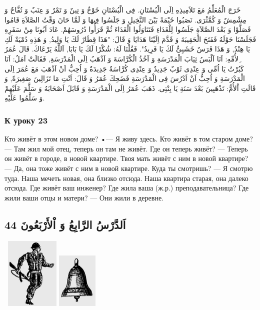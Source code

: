 \documentclass[a5paper]{article}
\begin{document}
خَرَجَ الْمُعَلِّمُ مَعَ تَلاَمِيذِهِ اِلَى الْبُسْتَانِ. فِى الْبُسْتَانِ خَوْخٌ وَ تِينٌ وَ تَمْرٌ وَ عِنَبٌ وَ تُفَّاحٌ وَ مِشْمِشٌ وَ كُمَّثْرَى. نَصَبُوا خَيْمَةً بَيْنَ النَّخِيلِ وَ جَلَسُوا فِيهَا وَ لَمَّا حَانَ وَقْتُ الصَّلاَةِ قَامُوا فَصَلَّوْا وَ بَعْدَ الصَّلاَةِ جَلَسُوا لِلْغَدَاءِ فَتَنَاوَلُوا الْغَدَاءَ ثُمَّ قَرَأُوا دُرُوسَهُمْ. عَادَ اَبُونَا مِنْ سَفَرِهِ فَجَلَسْنَا حَوْلَهُ فَفَتَحَ الْحَقِيبَةَ وَ قَدَّمَ اِلَيْنَا هَدَايَا وَ قَالَ: "هَذَا قِطَارٌ لَكَ يَا وَلِيدُ, وَ هَذِهِ دُمْيَةٌ لَكِ يَا هِنْدُ, وَ هَذَا فَرَسٌ خَشَبِىٌّ لَكَ يَا فَرِيدُ". فَقُلْنَا لَهُ: شُكْرًا لَكَ يَا بَابَا, اَللَّهُ يَرْعَاكَ. قَالَ عُمَرُ ِلأُمِّهِ: اَنَا اَلْبَسُ ثِيَابَ الْمَدْرَسَةِ وَ آخُذُ الْكُرَّاسَةَ وَ اَذْهَبُ اِلَى الْمَدْرَسَةِ, فَقَالَتْ اَمَلُ: اَنَا كَبُرْتُ يَا اُمِّى وَ عِنْدِى ثَوْبٌ جَدِيدٌ وَ عِنْدِى كُرَّاسَةٌ جَدِيدَةٌ وَ اُحِبُّ اَنْ اَذْهَبَ مَعَ عُمَرَ اِلَى الْمَدْرَسَةِ وَ اُحِبُّ اَنْ اَدْرُسَ فِى الْمَدْرَسَةِ فَضَحِكَ عُمَرُ وَ قَالَ: اَنْتِ مَا تَزَالِينَ صَغِيرَةً, وَ قَالَتِ اْلأُمُّ: تَذْهَبِينَ بَعْدَ سَنَةِ يَا بِنْتِى. ذَهَبَ عُمَرُ اِلَى الْمَدْرَسَةِ وَ قَابَلَ اَصْحَابَهُ وَ سَلَّمَ عَلَيْهِمْ وَ سَلَّمُوا عَلَيْهِ. 

\subsubsection{К уроку 23}
Кто живёт в этом новом доме? •— Я живу здесь. Кто живёт в том старом доме? — Там жил мой отец, теперь он там не живёт. Где он теперь живёт? — Теперь он живёт в городе, в новой квартире. Твоя мать живёт с ним в новой квартире? — Да, она тоже живёт с ним в новой квартире. Куда ты смотришь? — Я смотрю туда. Наша мечеть новая, она близко отсюда. Наша квартира старая, она далеко отсюда. Где живёт ваш инженер? Где жила ваша (ж.р.) преподавательница? Где жили ваши отцы и матери? — Они жили в деревне.

\subsection{اَلدَّرْسُ الرَّابِعُ وَ اْلأَرْبَعُونَ 44}
\  \includegraphics[width=1.0102in,height=1.3646in]{MuhammadBagauddinlatinized-img140.png}   \includegraphics[width=0.7602in,height=1.0626in]{MuhammadBagauddinlatinized-img141.png} 
\end{document}
